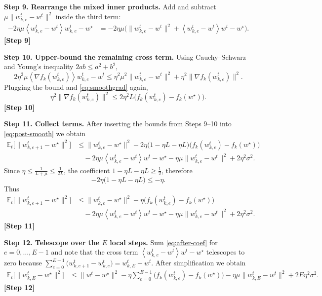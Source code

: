 \documentclass{article}
\newcommand{\EE}{\mathbb{E}}
\newcommand{\inner}[1]{\left\langle #1 \right\rangle}
\begin{document}
\noindent\textbf{Step 9.  Rearrange the mixed inner products.}  
Add and subtract $\mu\|w^{t}_{k,e}-w^{t}\|^2$ inside the third term:
\begin{align}
-2\eta\mu\inner{w^{t}_{k,e}-w^{t}}{w^{t}_{k,e}-w^\star}
&= -2\eta\mu\big(\|w^{t}_{k,e}-w^{t}\|^2
               +\inner{w^{t}_{k,e}-w^{t}}{w^{t}-w^\star}\big). \label{eq:mix}
\end{align}
\textbf{[Step 9]}

\noindent\textbf{Step 10.  Upper‑bound the remaining cross term.}  
Using Cauchy–Schwarz and Young’s inequality $2ab\le a^2+b^2$,
\[
2\eta^2\mu\inner{\nabla f_k(w^{t}_{k,e})}{w^{t}_{k,e}-w^{t}}
\le \eta^2\mu^2\|w^{t}_{k,e}-w^{t}\|^2
    +\eta^2\|\nabla f_k(w^{t}_{k,e})\|^2 .
\]
Plugging the bound and \eqref{eq:smoothgrad} again,
\[
\eta^2\|\nabla f_k(w^{t}_{k,e})\|^2\le 2\eta^2 L\big(f_k(w^{t}_{k,e})-f_k(w^\star)\big).
\]
\textbf{[Step 10]}

\noindent\textbf{Step 11.  Collect terms.}  
After inserting the bounds from Steps 9–10 into \eqref{eq:post-smooth} we obtain
\begin{align}
\EE_t\!\big[\|w^{t}_{k,e+1}-w^\star\|^2\big]
&\le \|w^{t}_{k,e}-w^\star\|^2
   -2\eta\big(1-\eta L- \eta L\big)\big(f_k(w^{t}_{k,e})-f_k(w^\star)\big) \nonumber\\
&\quad -2\eta\mu\inner{w^{t}_{k,e}-w^{t}}{w^{t}-w^\star}
   -\eta\mu\|w^{t}_{k,e}-w^{t}\|^2
   +2\eta^2\sigma^2 . \label{eq:pre-agg}
\end{align}
Since $\eta\le \frac{1}{L+\mu}\le\frac{1}{2L}$, the coefficient $1-\eta L-\eta L\ge \frac12$, therefore
\[
-2\eta\big(1-\eta L- \eta L\big)\le -\eta .
\]
Thus
\begin{align}
\EE_t\!\big[\|w^{t}_{k,e+1}-w^\star\|^2\big]
&\le \|w^{t}_{k,e}-w^\star\|^2
   -\eta\big(f_k(w^{t}_{k,e})-f_k(w^\star)\big) \nonumber\\
&\quad -2\eta\mu\inner{w^{t}_{k,e}-w^{t}}{w^{t}-w^\star}
   -\eta\mu\|w^{t}_{k,e}-w^{t}\|^2
   +2\eta^2\sigma^2 . \label{eq:after-coef}
\end{align}
\textbf{[Step 11]}

\noindent\textbf{Step 12.  Telescope over the $E$ local steps.}  
Sum \eqref{eq:after-coef} for $e=0,\dots ,E-1$ and note that the cross term $\inner{w^{t}_{k,e}-w^{t}}{w^{t}-w^\star}$ telescopes to zero because $\sum_{e=0}^{E-1}\big(w^{t}_{k,e+1}-w^{t}_{k,e}\big)=w^{t}_{k,E}-w^{t}$.  After simplification we obtain
\begin{align}
\EE_t\!\big[\|w^{t}_{k,E}-w^\star\|^2\big]
&\le \|w^{t}-w^\star\|^2
   -\eta\sum_{e=0}^{E-1}\big(f_k(w^{t}_{k,e})-f_k(w^\star)\big)
   -\eta\mu\|w^{t}_{k,E}-w^{t}\|^2
   +2E\eta^2\sigma^2 . \label{eq:after-tel}
\end{align}
\textbf{[Step 12]}
\end{document}
